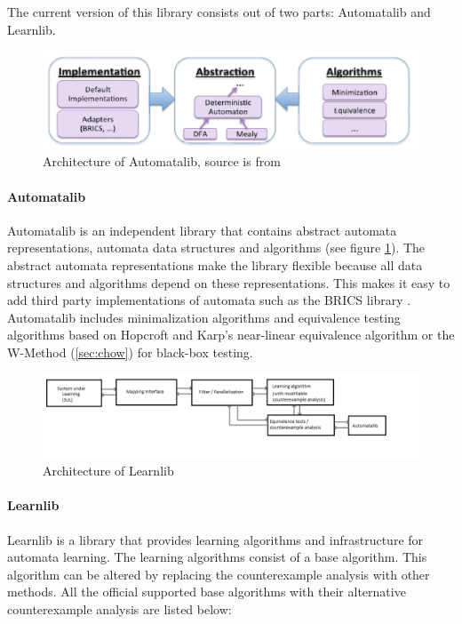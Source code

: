 The current version of this library consists out of two parts: Automatalib and
Learnlib.

\begin{figure}[!ht]
	\includegraphics[width=\textwidth]{Tool_images/automatalib_architecture.png}
	\caption{Architecture of Automatalib, source is from \cite{Isberner2015b}}
	\label{fig:automatalib_arch}
\end{figure}

\paragraph{Automatalib} Automatalib is an independent library that contains
abstract automata representations, automata data structures and algorithms (see
figure \ref{fig:automatalib_arch}). The
abstract automata representations make the library flexible because all data
structures and algorithms depend on these representations. This makes it easy
to add third party implementations of automata such as the BRICS library
\cite{Alur2005}. Automatalib includes minimalization algorithms and equivalence
testing algorithms based on Hopcroft and Karp's near-linear equivalence
algorithm \cite{Hopcroft1971} or the W-Method (\cref{sec:chow}) for
black-box testing.

\begin{figure}[!ht]
	\includegraphics[width=\textwidth]{Tool_images/learnlib_architecture.png}
	\caption{Architecture of Learnlib}
	\label{fig:learnlib_arch}
\end{figure}

\paragraph{Learnlib} Learnlib is a library that provides learning algorithms and
infrastructure for automata learning. The learning algorithms consist of a base
algorithm. This algorithm can be altered by replacing the counterexample
analysis with other methods. All the official supported base algorithms with
their alternative counterexample analysis are listed below:


